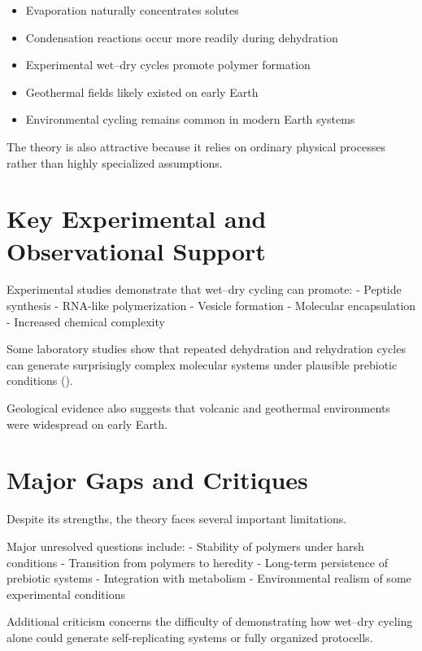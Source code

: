 \documentclass[
  oneside]{book}
\providecommand{\tightlist}{%
  \setlength{\itemsep}{0pt}\setlength{\parskip}{0pt}}
\begin{document}
\begin{itemize}
\tightlist
\item
  Evaporation naturally concentrates solutes
\item
  Condensation reactions occur more readily during dehydration
\item
  Experimental wet--dry cycles promote polymer formation
\item
  Geothermal fields likely existed on early Earth
\item
  Environmental cycling remains common in modern Earth systems
\end{itemize}

The theory is also attractive because it relies on ordinary physical processes rather than highly specialized assumptions.

\section{Key Experimental and Observational Support}\label{key-experimental-and-observational-support-4}

Experimental studies demonstrate that wet--dry cycling can promote:
- Peptide synthesis
- RNA-like polymerization
- Vesicle formation
- Molecular encapsulation
- Increased chemical complexity

Some laboratory studies show that repeated dehydration and rehydration cycles can generate surprisingly complex molecular systems under plausible prebiotic conditions ().

Geological evidence also suggests that volcanic and geothermal environments were widespread on early Earth.

\section{Major Gaps and Critiques}\label{major-gaps-and-critiques-4}

Despite its strengths, the theory faces several important limitations.

Major unresolved questions include:
- Stability of polymers under harsh conditions
- Transition from polymers to heredity
- Long-term persistence of prebiotic systems
- Integration with metabolism
- Environmental realism of some experimental conditions

Additional criticism concerns the difficulty of demonstrating how wet--dry cycling alone could generate self-replicating systems or fully organized protocells.
\end{document}
